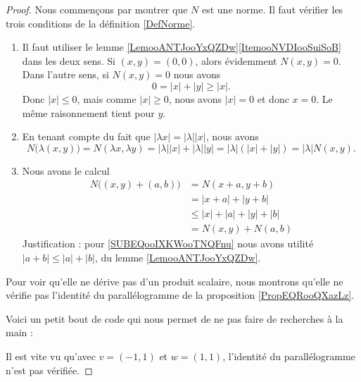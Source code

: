 \begin{proof}
    Nous commençons par montrer que \( N\) est une norme. Il faut vérifier les trois conditions de la définition \ref{DefNorme}.
    \begin{enumerate}
        \item
            Il faut utiliser le lemme \ref{LemooANTJooYxQZDw}\ref{ItemooNVDIooSuiSoB} dans les deux sens. Si \( (x,y)=(0,0)\), alors évidemment \( N(x,y)=0\). Dans l'autre sens, si \( N(x,y)=0\) nous avons
            \begin{equation}
                0=| x |+| y |\geq | x |.
            \end{equation}
            Donc \( | x |\leq 0\), mais comme \( | x |\geq 0\), nous avons \( | x |=0\) et donc \( x=0\). Le même raisonnement tient pour \( y\).
        \item
            En tenant compte du fait que \( | \lambda x |=| \lambda | |x |\), nous avons
            \begin{equation}
                N\big( \lambda(x,y) \big)=N(\lambda x,\lambda y)=| \lambda | |x |+| \lambda | |y |=| \lambda |(| x |+| y |)=| \lambda |N(x,y).
            \end{equation}
        \item
            Nous avons le calcul
            \begin{subequations}
                \begin{align}
                    N\big( (x,y)+(a,b) \big)&=N(x+a,y+b)\\
                    &=| x+a |+| y+b |\\
                    &\leq | x |+| a |+| y |+| b |       \label{SUBEQooIXKWooTNQFnu}\\
                    &=N(x,y)+N(a,b)
                \end{align}
            \end{subequations}
            Justification : pour \eqref{SUBEQooIXKWooTNQFnu} nous avons utilité \( | a+b |\leq | a |+| b |\), du lemme \ref{LemooANTJooYxQZDw}.
    \end{enumerate}
    Pour voir qu'elle ne dérive pas d'un produit scalaire, nous montrons qu'elle ne vérifie pas l'identité du parallélogramme de la proposition \ref{PropEQRooQXazLz}.

    Voici un petit bout de code qui nous permet de ne pas faire de recherches à la main :
    

    Il est vite vu qu'avec \( v=(-1,1)\) et \( w=(1,1)\), l'identité du parallélogramme n'est pas vérifiée.
\end{proof}

